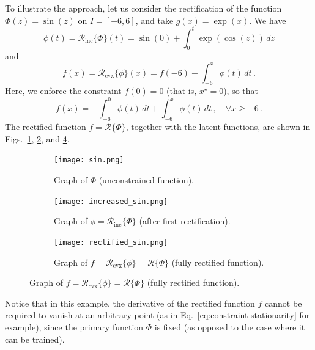\begin{remark}
To illustrate the approach, let us consider the rectification of the function $\Phi(z) = \sin(z)$ on $I = [-6, 6]$, and take $g(x) = \exp(x)$. We have 
\begin{equation}
    \phi(t) = \mathcal{R}_{\mathrm{inc}}\{\Phi\}(t) = \sin(0) + \int_0^t \exp\left(\cos(z)\right)\,dz
\end{equation}
and
\begin{equation}
    f(x) = \mathcal{R}_{\mathrm{cvx}}\{\phi\}(x) = f(-6) + \int_{-6}^x \phi(t)\,dt\,.
\end{equation}
Here, we enforce the constraint $f(0) = 0$ (that is, $x^\star = 0$), so that
\begin{equation}
    f(x) = - \int_{-6}^{0} \phi(t)\,dt + \int_{-6}^x \phi(t)\,dt\,, \quad \forall x \geq -6\,. 
\end{equation}
The rectified function $f = \mathcal{R}\{\Phi\}$, together with the latent functions, are shown in Figs.~\ref{fig:sin example 1}, \ref{fig:sin example 2}, and \ref{fig:sin example 3}.
\begin{figure}[ht!]
    \begin{center}
        \begin{subfigure}[b]{0.32\textwidth}
            \begin{center}
                \texttt{[image: sin.png]}
            \end{center}
                \caption[Graph of $\Phi$.]{Graph of $\Phi$ (unconstrained function).}
        \label{fig:sin example 1}
          \end{subfigure}
        \begin{subfigure}[b]{0.32\textwidth}
            \begin{center}
                \texttt{[image: increased\_sin.png]}
            \end{center}
    \caption[Graph of $\phi = \mathcal{R}_{\mathrm{inc}}\{\Phi\}$.]{Graph of $\phi = \mathcal{R}_{\mathrm{inc}}\{\Phi\}$ (after first rectification).}
        \label{fig:sin example 2}
          \end{subfigure}
    \begin{subfigure}[b]{0.32\textwidth}
            \begin{center}
                \texttt{[image: rectified\_sin.png]}
            \end{center}
    \caption[Graph of $f = \mathcal{R}_{\mathrm{cvx}}\{\phi\} = \mathcal{R}\{\Phi\}$.]{Graph of $f = \mathcal{R}_{\mathrm{cvx}}\{\phi\} = \mathcal{R}\{\Phi\}$ (fully rectified function).}
    \label{fig:sin example 3}
          \end{subfigure}
        
    \end{center}
\end{figure}

Notice that in this example, the derivative of the rectified function $f$ cannot be required to vanish at an arbitrary point (as in Eq.~\eqref{eq:constraint-stationarity} for example), since the primary function $\Phi$ is fixed (as opposed to the case where it can be trained). 
\end{remark}


